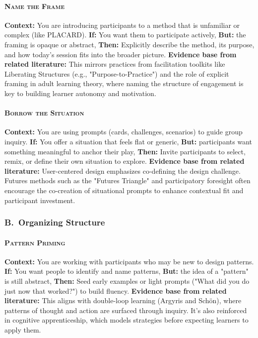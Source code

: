 \documentclass[acmlarge,timestamp]{acmart}
\begin{document}
{\paragraph*{{\scshape Name the Frame}}

\noindent\textbf{Context:} You are introducing participants to a method that is unfamiliar or complex (like PLACARD).
\textbf{If:} You want them to participate actively,  \textbf{But:} the framing is opaque or abstract,
\textbf{Then:} Explicitly describe the method, its purpose, and how today’s session fits into the broader picture.
\textbf{Evidence base from related literature:} This mirrors practices from facilitation toolkits like Liberating Structures (e.g., "Purpose-to-Practice") and the role of explicit framing in adult learning theory, where naming the structure of engagement is key to building learner autonomy and motivation.

\paragraph*{{\scshape Borrow the Situation}}

\noindent \textbf{Context:} You are using prompts (cards, challenges, scenarios) to guide group inquiry.
\textbf{If:} You offer a situation that feels flat or generic,  \textbf{But:} participants want something meaningful to anchor their play,
\textbf{Then:} Invite participants to select, remix, or define their own situation to explore.
\textbf{Evidence base from related literature:} User-centered design emphasizes co-defining the design challenge. Futures methods such as the "Futures Triangle" and participatory foresight often encourage the co-creation of situational prompts to enhance contextual fit and participant investment.

\subsubsection*{B.~Organizing Structure}

\paragraph*{{\scshape Pattern Priming}}

\noindent \textbf{Context:} You are working with participants who may be new to design patterns.
\textbf{If:} You want people to identify and name patterns,  \textbf{But:} the idea of a "pattern" is still abstract,
\textbf{Then:} Seed early examples or light prompts ("What did you do just now that worked?") to build fluency.
\textbf{Evidence base from related literature:} This aligns with double-loop learning (Argyris and Schön), where patterns of thought and action are surfaced through inquiry. It's also reinforced in cognitive apprenticeship, which models strategies before expecting learners to apply them.

}
\end{document}
